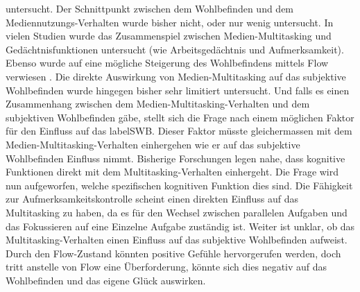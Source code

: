 untersucht. Der Schnittpunkt zwischen dem Wohlbefinden und dem Mediennutzungs-Verhalten wurde bisher nicht, oder nur wenig untersucht. 
In vielen Studien wurde das Zusammenspiel zwischen Medien-Multitasking und Gedächtnisfunktionen untersucht (wie Arbeitsgedächtnis und Aufmerksamkeit). Ebenso wurde auf eine mögliche Steigerung des Wohlbefindens mittels Flow verwiesen \cite{Klingberg2008}. Die direkte Auswirkung von Medien-Multitasking auf das subjektive Wohlbefinden wurde hingegen bisher sehr limitiert untersucht. Und falls es einen Zusammenhang zwischen dem Medien-Multitasking-Verhalten und dem subjektiven Wohlbefinden gäbe, stellt sich die Frage nach einem möglichen Faktor für den Einfluss auf das \gls{labelSWB}. Dieser Faktor müsste gleichermassen mit dem Medien-Multitasking-Verhalten einhergehen wie er auf das subjektive Wohlbefinden Einfluss nimmt. Bisherige Forschungen legen nahe, dass kognitive Funktionen direkt mit dem Multitasking-Verhalten einhergeht. Die Frage wird nun aufgeworfen, welche spezifischen kognitiven Funktion dies sind. Die Fähigkeit zur Aufmerksamkeitskontrolle scheint einen direkten Einfluss auf das Multitasking zu haben, da es für den Wechsel zwischen parallelen Aufgaben und das Fokussieren auf eine Einzelne Aufgabe zuständig ist. Weiter ist unklar, ob das Multitasking-Verhalten einen Einfluss auf das subjektive Wohlbefinden aufweist. Durch den Flow-Zustand könnten positive Gefühle hervorgerufen werden, doch tritt anstelle von Flow eine Überforderung, könnte sich dies negativ auf das Wohlbefinden und das eigene Glück auswirken.

